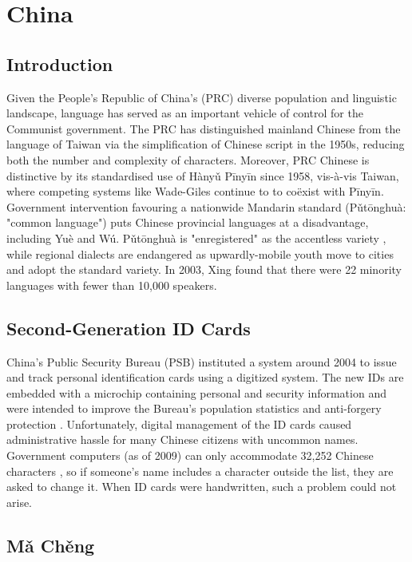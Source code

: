 \section{China}

\subsection{Introduction}

Given the People's Republic of China's (PRC) diverse population and linguistic
landscape, language has served as an important vehicle of control for the
Communist government. The PRC has distinguished mainland Chinese from the
language of Taiwan via the simplification of Chinese script in the 1950s,
reducing both the number and complexity of characters. Moreover, PRC Chinese is
distinctive by its standardised use of Hànyǔ Pīnyīn since 1958, vis-à-vis
Taiwan, where competing systems like Wade-Giles continue to to coëxist with
Pīnyīn. Government intervention favouring a nationwide Mandarin standard
(Pǔtōnghuà: "common language") puts Chinese provincial languages at a
disadvantage, including Yuè and Wú. Pǔtōnghuà is "enregistered" as the
accentless variety \parencite{dong10}, while regional dialects are endangered as
upwardly-mobile youth move to cities and adopt the standard variety. In 2003,
Xing found that there were 22 minority languages with fewer than 10,000
speakers.

\subsection{Second-Generation ID Cards}

China's Public Security Bureau (PSB) instituted a system around 2004 to issue
and track personal identification cards using a digitized system. The new IDs
are embedded with a microchip containing personal and security information and
were intended to improve the Bureau's population statistics and anti-forgery
protection \parencite{ciicn04}. Unfortunately, digital management of the ID
cards caused administrative hassle for many Chinese citizens with uncommon
names. Government computers (as of 2009) can only accommodate 32,252 Chinese
characters \parencite{lafraniere09}, so if someone's name includes a character
outside the list, they are asked to change it. When ID cards were handwritten,
such a problem could not arise.

\subsection{Mǎ Chěng}

